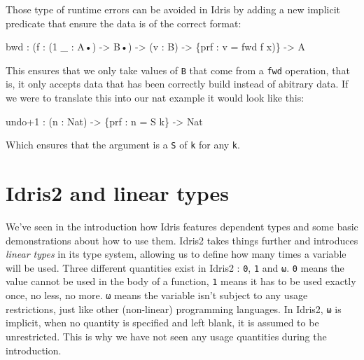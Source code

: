 \documentclass[
]{article}
\newenvironment{Shaded}{}{}
\newcommand{\DataTypeTok}[1]{\textcolor[rgb]{0.56,0.13,0.00}{#1}}
\newcommand{\DecValTok}[1]{\textcolor[rgb]{0.25,0.63,0.44}{#1}}
\newcommand{\NormalTok}[1]{#1}
\newcommand{\OperatorTok}[1]{\textcolor[rgb]{0.40,0.40,0.40}{#1}}
\newcommand{\OtherTok}[1]{\textcolor[rgb]{0.00,0.44,0.13}{#1}}
\begin{document}
Those type of runtime errors can be avoided in Idris by adding a new
implicit predicate that ensure the data is of the correct format:

\begin{Shaded}
\begin{Highlighting}[]
\NormalTok{bwd }\OperatorTok{:}\NormalTok{ (f }\OperatorTok{:}\NormalTok{ (}\DecValTok{1}\NormalTok{ \_ }\OperatorTok{:} \DataTypeTok{A}\NormalTok{•) }\OtherTok{{-}\textgreater{}} \DataTypeTok{B}\NormalTok{•) }\OtherTok{{-}\textgreater{}}\NormalTok{ (v }\OperatorTok{:} \DataTypeTok{B}\NormalTok{) }\OtherTok{{-}\textgreater{}}\NormalTok{ \{prf }\OperatorTok{:}\NormalTok{ v }\OtherTok{=}\NormalTok{ fwd f x)\} }\OtherTok{{-}\textgreater{}} \DataTypeTok{A}
\end{Highlighting}
\end{Shaded}

This ensures that we only take values of \texttt{B} that come from a
\texttt{fwd} operation, that is, it only accepts data that has been
correctly build instead of abitrary data. If we were to translate this
into our nat example it would look like this:

\begin{Shaded}
\begin{Highlighting}[]
\NormalTok{undo}\OperatorTok{+}\DecValTok{1} \OperatorTok{:}\NormalTok{ (n }\OperatorTok{:} \DataTypeTok{Nat}\NormalTok{) }\OtherTok{{-}\textgreater{}}\NormalTok{ \{prf }\OperatorTok{:}\NormalTok{ n }\OtherTok{=} \DataTypeTok{S}\NormalTok{ k\} }\OtherTok{{-}\textgreater{}} \DataTypeTok{Nat}
\end{Highlighting}
\end{Shaded}

Which ensures that the argument is a \texttt{S} of \texttt{k} for any
\texttt{k}.

\newpage

\hypertarget{idris2-and-linear-types}{%
\section{Idris2 and linear types}\label{idris2-and-linear-types}}

We've seen in the introduction how Idris features dependent types and
some basic demonstrations about how to use them. Idris2 takes things
further and introduces \emph{linear types} in its type system, allowing
us to define how many times a variable will be used. Three different
quantities exist in Idris2 : \texttt{0}, \texttt{1} and \texttt{ω}.
\texttt{0} means the value cannot be used in the body of a function,
\texttt{1} means it has to be used exactly once, no less, no more.
\texttt{ω} means the variable isn't subject to any usage restrictions,
just like other (non-linear) programming languages. In Idris2,
\texttt{ω} is implicit, when no quantity is specified and left blank, it
is assumed to be unrestricted. This is why we have not seen any usage
quantities during the introduction.
\end{document}
